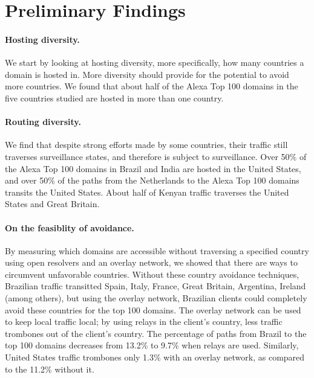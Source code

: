 \section{Preliminary Findings}

\paragraph{Hosting diversity.}
We start by looking at hosting diversity, more specifically, how many
countries a domain is hosted in.  More diversity should provide for the
potential to avoid more countries.  We found that about half of the
Alexa Top 100 domains in the five countries studied are hosted in more
than one country. 

\paragraph{Routing diversity.}
We find that despite strong efforts made by some countries,
their traffic still traverses surveillance states, and therefore is
subject to surveillance.  Over 50\% of the Alexa Top 100 domains in
Brazil and India are hosted in the United States, and over 50\% of the
paths from the Netherlands to the Alexa Top 100 domains transits the
United States.  About half of Kenyan traffic traverses the United States
and Great Britain.   

\paragraph{On the feasiblity of avoidance.}
By measuring which domains are accessible without traversing a specified
country using open resolvers and an overlay network, we showed that
there are ways to circumvent unfavorable countries.  Without these
country avoidance techniques, Brazilian traffic transitted Spain, Italy,
France, Great Britain, Argentina, Ireland (among others), but using the
overlay network, Brazilian clients could completely avoid these
countries for the top 100 domains.  The overlay network can be used to
keep local traffic local; by using relays in the client's country, less
traffic trombones out of the client's country.  The percentage of paths
from Brazil to the top 100 domains decreases from 13.2\% to 9.7\% when
relays are used.  Similarly, United States traffic trombones only 1.3\%
with an overlay network, as compared to the 11.2\% without it.   

